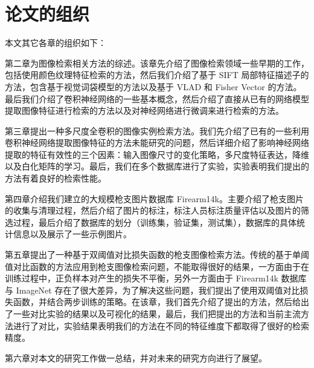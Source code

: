 \section{论文的组织}
本文其它各章的组织如下：

第二章为图像检索相关方法的综述。该章先介绍了图像检索领域一些早期的工作，包括使用颜色纹理特征检索的方法，然后我们介绍了基于 SIFT 局部特征描述子的方法，包含基于视觉词袋模型的方法以及基于 VLAD 和 Fisher Vector 的方法。最后我们介绍了卷积神经网络的一些基本概念，然后介绍了直接从已有的网络模型提取图像特征进行检索的方法以及对神经网络进行微调来进行检索的方法。

第三章提出一种多尺度全卷积的图像实例检索方法。我们先介绍了已有的一些利用卷积神经网络提取图像特征的方法未能研究的问题，然后详细介绍了影响神经网络提取的特征有效性的三个因素：输入图像尺寸的变化策略，多尺度特征表达，降维以及白化矩阵的学习。最后，我们在多个数据库进行了实验，实验表明我们提出的方法有着良好的检索性能。

第四章介绍我们建立的大规模枪支图片数据库 Firearm14k。主要介绍了枪支图片的收集与清理过程，然后介绍了图片的标注，标注人员标注质量评估以及图片的筛选过程，最后介绍了数据库的划分（训练集，验证集，测试集），数据库的具体统计信息以及展示了一些示例图片。

第五章提出了一种基于双阈值对比损失函数的枪支图像检索方法。传统的基于单阈值对比函数的方法应用到枪支图像检索问题，不能取得很好的结果，一方面由于在训练过程中，正负样本对产生的损失不平衡，另外一方面由于 Firearm14k 数据库与 ImageNet 存在了很大差异，为了解决这些问题，我们提出了使用双阈值对比损失函数，并结合两步训练的策略。在该章，我们首先介绍了提出的方法，然后给出了一些对比实验的结果以及可视化的结果，最后，我们把提出的方法和当前主流方法进行了对比，实验结果表明我们的方法在不同的特征维度下都取得了很好的检索精度。

第六章对本文的研究工作做一总结，并对未来的研究方向进行了展望。
